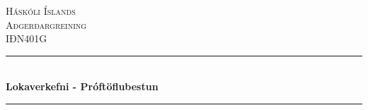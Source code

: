 \documentclass[12pt]{article}
\begin{document}
\newcommand{\sz}{\overline{z}}
\newcommand{\saf}{\overline{f}}
\newcommand{\sw}{\overline{w}}

\newcommand{\pz}{\partial_z}
\newcommand{\psz}{\partial_{\overline{z}}}

\newcommand{\Nv}{\mbox{${\bf N}$}}

\newcommand{\Bv}{\mbox{${\bf B}$}}


\newcommand{\Tv}{\mbox{${\bf T}$}}



	\begin{titlepage}
        
        \newcommand{\HRule}{\rule{\linewidth}{0.5mm}} %
        
        \center %
        
        
        \textsc{\LARGE Háskóli Íslands}\\[1.5cm] %
        \textsc{\Large Aðgerðargreining}\\[0.5cm] %
        \textsc{\large IÐN401G}\\[0.5cm] %
        
        
        \HRule \\[0.4cm]
        { \huge \bfseries Lokaverkefni - Próftöflubestun}\\[0.4cm] %
        \HRule \\[1.5cm]
        
        

\end{titlepage}
\end{document}
